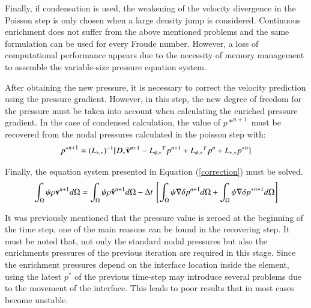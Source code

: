 Finally, if condensation is used, the weakening of the velocity divergence in the Poisson step is only chosen when a large density jump is considered. Continuous enrichment does not suffer from the above mentioned problems and the same formulation can be used for every Froude number. However, a loss of computational performance appears due to the necessity of memory management to assemble the variable-size pressure equation system.


%

After obtaining the new pressure, it is necessary to correct the velocity prediction using the pressure gradient. However, in this step, the new degree of freedom for the pressure must be taken into account when calculating the enriched pressure gradient. In the case of condensed calculation, the value of $p*^{n+1}$ must be recovered from the nodal pressures calculated in the poisson step with:
\begin{equation}
  {p^*}^{n+1} = {(L_{*,*})}^{-1}[D_* \hat{\mathbf{v}}^{n+1} - {L_{\phi,*}}^Tp^{n+1} + {L_{\phi,*}}^Tp^{n} + L_{*,*}{p^*}^n]
  \label{recovering}
\end{equation}

Finally, the equation system presented in Equation (\ref{correction}) must be solved.
 \begin{equation}
  \int_{\Omega} \psi \rho \vv^{n+1} d\Omega = \int_{\Omega} \psi \rho \hat{\vv}^{n+1} d\Omega - \Delta t \ \left[\int_{\Omega} \psi \nabla \delta p^{n+1} d\Omega + \int_{\Omega} \psi \nabla \delta {p^*}^{n+1} d\Omega \right]
  \label{correction}
 \end{equation}

It was previously mentioned that the pressure value is zeroed at the beginning of the time step, one of the main reasons can be found in the recovering step. It must be noted that, not only the standard nodal pressures but also the enrichments pressures of the previous iteration are required in this stage. Since the enrichment pressures depend on the interface location inside the element, using the latest $p^*$ of the previous time-step may introduce several problems due to the movement of the interface. This leads to poor results that in most cases become unstable.

